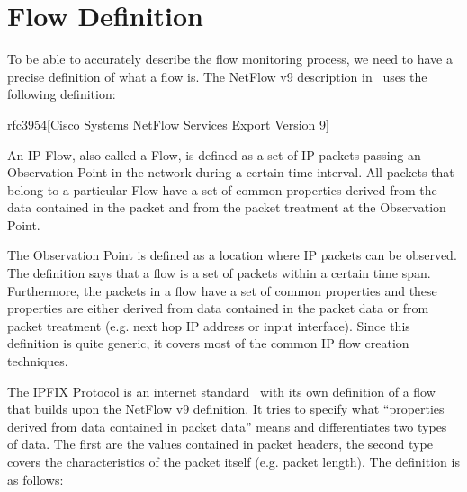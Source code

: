 \section{Flow Definition}\label{sec:flow-definition}

To be able to accurately describe the flow monitoring process, we need to have a precise definition of what a flow is. The NetFlow v9 description in~\cite{rfc3954} uses the following definition:

\begin{displaycquote}{rfc3954}[Cisco Systems NetFlow Services Export Version 9]

    An IP Flow, also called a Flow, is defined as a set of IP packets
    passing an Observation Point in the network during a certain time
    interval. All packets that belong to a particular Flow have a set of
    common properties derived from the data contained in the packet and
    from the packet treatment at the Observation Point.

\end{displaycquote}

The Observation Point is defined as a location where IP packets can be observed. The definition says that a flow is a set of packets within a certain time span. Furthermore, the packets in a flow have a set of common properties and these properties are either derived from data contained in the packet data or from packet treatment (e.g. next hop IP address or input interface). Since this definition is quite generic, it covers most of the common IP flow creation techniques.

The IPFIX Protocol is an internet standard~\cite{rfc7011} with its own definition of a flow that builds upon the NetFlow v9 definition. It tries to specify what “properties derived from data contained in packet data” means and differentiates two types of data. The first are the values contained in packet headers, the second type covers the characteristics of the packet itself (e.g. packet length). The definition is as follows:

